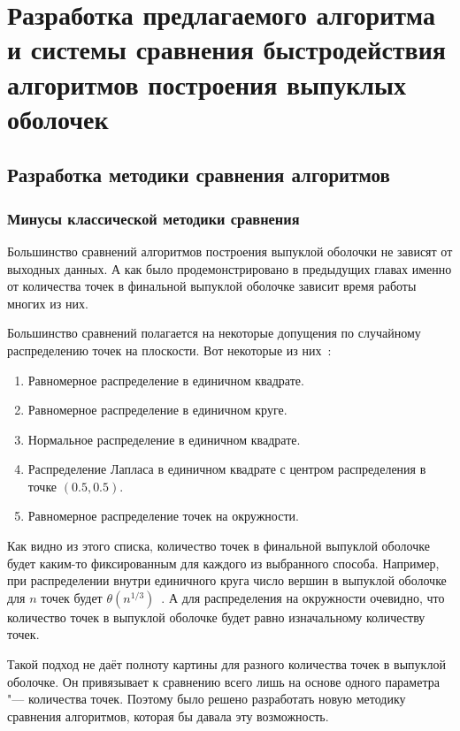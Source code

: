 \chapter{Разработка предлагаемого алгоритма и системы сравнения быстродействия алгоритмов построения выпуклых оболочек} \label{chapt3}

\section{Разработка методики сравнения алгоритмов}

\subsection{Минусы классической методики сравнения}

Большинство сравнений алгоритмов построения выпуклой оболочки не зависят от выходных данных. А как было продемонстрировано в предыдущих главах именно от количества точек в финальной выпуклой оболочке зависит время работы многих из них.

Большинство сравнений полагается на некоторые допущения по случайному распределению точек на плоскости. Вот некоторые из них~\cite{chadnov2004algorithmsComparison}:

\begin{enumerate}
	\item Равномерное распределение в единичном квадрате.
	\item Равномерное распределение в единичном круге.
	\item Нормальное распределение в единичном квадрате.
	\item Распределение Лапласа в единичном квадрате с центром распределения в точке $(0.5, 0.5)$.
	\item Равномерное распределение точек на окружности.
\end{enumerate}


Как видно из этого списка, количество точек в финальной выпуклой оболочке будет каким-то фиксированным для каждого из выбранного способа. Например, при распределении внутри единичного круга число вершин в выпуклой оболочке для $n$ точек будет $\theta(n^{1/3})$~\cite{algolist2010convexhull}. А для распределения на окружности очевидно, что количество точек в выпуклой оболочке будет равно изначальному количеству точек.

Такой подход не даёт полноту картины для разного количества точек в выпуклой оболочке. Он привязывает к сравнению всего лишь на основе одного параметра "--- количества точек. Поэтому было решено разработать новую методику сравнения алгоритмов, которая бы давала эту возможность.

